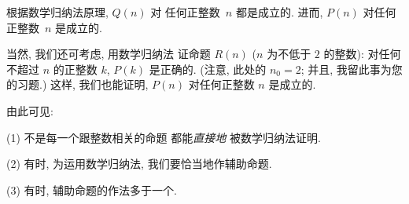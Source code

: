 \begin{example}
    根据数学归纳法原理, \(Q(n)\) 对%
    任何正整数~\(n\) 都是成立的.
    进而, \(P(n)\) 对任何正整数~\(n\) 是成立的.

    当然, 我们还可考虑, 用数学归纳法%
    证命题 \(R(n)\)
    (\(n\) 为不低于 \(2\) 的整数):
    对任何不超过 \(n\) 的正整数 \(k\),
    \(P(k)\) 是正确的.
    (注意, 此处的 \(n_0 = 2\);
    并且, 我留此事为您的习题.)
    这样, 我们也能证明,
    \(P(n)\) 对任何正整数 \(n\) 是成立的.

    由此可见:

    (1)
    不是每一个跟整数相关的命题%
    都能\emph{直接地}%
    被数学归纳法证明.

    (2)
    有时, 为运用数学归纳法,
    我们要恰当地作辅助命题.

    (3)
    有时, 辅助命题的作法多于一个.
\end{example}


